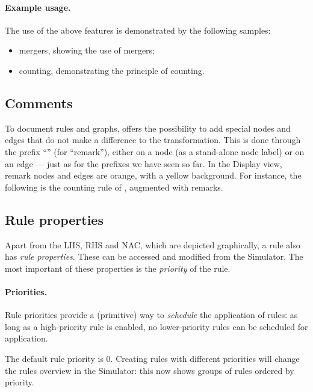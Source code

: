 \paragraph{Example usage.}

The use of the above features is demonstrated by the following \GROOVE samples:
%
\begin{itemize}[noitemsep]
\item \textsf{mergers}, showing the use of mergers;
\item \textsf{counting}, demonstrating the principle of counting.
\end{itemize}

\subsection{Comments}

To document rules and graphs, \GROOVE offers the possibility to add special
nodes and edges that do not make a difference to the transformation. This is
done through the prefix ``\remP'' (for ``remark''), either on a node (as a
stand-alone node label) or on an edge --- just as for the prefixes we have seen
so far. In the Display view, remark nodes and edges are orange, with a yellow
background. For instance, the following is the counting rule of
, augmented with remarks.


\subsection{Rule properties}

Apart from the LHS, RHS and NAC, which are depicted graphically, a rule also
has \emph{rule properties}. These can be accessed and modified from the
Simulator. The most important of these properties is the \emph{priority} of the
rule.

\paragraph{Priorities.}

Rule priorities provide a (primitive) way to
\emph{schedule} the application of rules: as long as a high-priority rule is
enabled, no lower-priority rules can be scheduled for application.

The default rule priority is 0. Creating rules with different priorities will
change the rules overview in the Simulator: this now shows groups of rules
ordered by priority.

